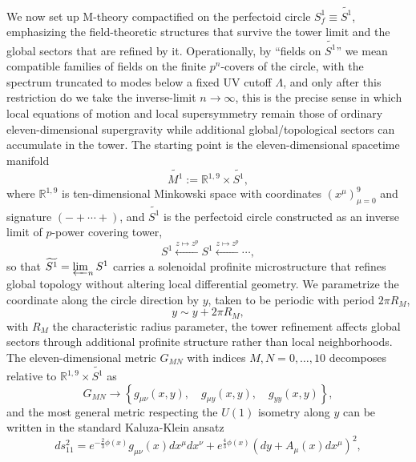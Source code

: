 \documentclass[11pt]{article}
\theoremstyle{remark}
\newcommand{\R}{\mathbb{R}}
\newcommand{\tS}{\widetilde{S^{1}}}
\newcommand{\tM}{\widetilde{M^{1}}}
\begin{document}
We now set up M-theory compactified on the perfectoid circle \(S_f^1\equiv \tS\), emphasizing the field-theoretic structures that survive the tower limit and the global sectors that are refined by it. Operationally, by ``fields on \(\tS\)'' we mean compatible families of fields on the finite \(p^{n}\)-covers of the circle, with the spectrum truncated to modes below a fixed UV cutoff \(\Lambda\), and only after this restriction do we take the inverse-limit \(n\to\infty\), this is the precise sense in which local equations of motion and local supersymmetry remain those of ordinary eleven-dimensional supergravity while additional global/topological sectors can accumulate in the tower. The starting point is the eleven-dimensional spacetime manifold
\begin{equation}
  \tM := \R^{1,9} \times \tS,
\end{equation}
where \(\R^{1,9}\) is ten-dimensional Minkowski space with coordinates \((x^{\mu})_{\mu=0}^{9}\) and signature \((- + \cdots +)\), and \(\tS\) is the perfectoid circle constructed as an inverse limit of \(p\)-power covering tower,
\begin{equation}
S^{1} \xleftarrow{z \mapsto z^{p}} S^{1} \xleftarrow{z \mapsto z^{p}} \cdots,
\end{equation}
so that \(\tS=\varprojlim_n S^{1}\) carries a solenoidal profinite microstructure that refines global topology without altering local differential geometry. We parametrize the coordinate along the circle direction by \(y\), taken to be periodic with period \(2\pi R_{M}\),
\begin{equation}
y \sim y + 2\pi R_{M},
\end{equation}
with \(R_{M}\) the characteristic radius parameter, the tower refinement affects global sectors through additional profinite structure rather than local neighborhoods. The eleven-dimensional metric \(G_{MN}\) with indices \(M,N=0,\ldots,10\) decomposes relative to \(\R^{1,9}\times \tS\) as
\begin{equation}
G_{MN} \longrightarrow \left\{g_{\mu\nu}(x,y), \quad g_{\mu y}(x,y), \quad g_{yy}(x,y) \right\},
\end{equation}
and the most general metric respecting the \(U(1)\) isometry along \(y\) can be written in the standard Kaluza-Klein ansatz
\begin{equation}
\label{eq:Mtheory-KK-metric}
ds^{2}_{11} = e^{-\frac{2}{3}\phi(x)} g_{\mu\nu}(x) dx^{\mu} dx^{\nu} + e^{\frac{4}{3}\phi(x)} \left( dy + A_{\mu}(x) dx^{\mu} \right)^{2},
\end{equation}
\end{document}
